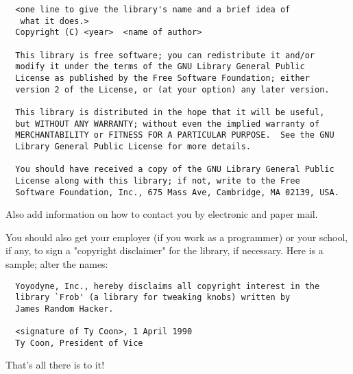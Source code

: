 \begin{verbatim}
  <one line to give the library's name and a brief idea of 
   what it does.>
  Copyright (C) <year>  <name of author>

  This library is free software; you can redistribute it and/or
  modify it under the terms of the GNU Library General Public
  License as published by the Free Software Foundation; either
  version 2 of the License, or (at your option) any later version.

  This library is distributed in the hope that it will be useful,
  but WITHOUT ANY WARRANTY; without even the implied warranty of
  MERCHANTABILITY or FITNESS FOR A PARTICULAR PURPOSE.  See the GNU
  Library General Public License for more details.

  You should have received a copy of the GNU Library General Public
  License along with this library; if not, write to the Free
  Software Foundation, Inc., 675 Mass Ave, Cambridge, MA 02139, USA.
\end{verbatim}

Also add information on how to contact you by electronic and paper mail.

You should also get your employer (if you work as a programmer) or your
school, if any, to sign a "copyright disclaimer" for the library, if
necessary.  Here is a sample; alter the names:

\begin{verbatim}
  Yoyodyne, Inc., hereby disclaims all copyright interest in the
  library `Frob' (a library for tweaking knobs) written by 
  James Random Hacker.

  <signature of Ty Coon>, 1 April 1990
  Ty Coon, President of Vice
\end{verbatim}

That's all there is to it!
